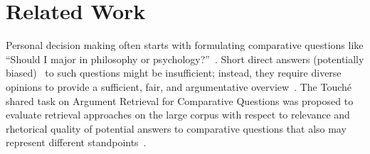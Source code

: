 \section{Related Work}

Personal decision making often starts with formulating comparative questions like ``Should I major in philosophy or psychology?''~\cite{BondarenkoFBGAPBSWPH2020,BondarenkoGFBAPBSWPH2021,BondarenkoFKSGBPBSWPH2022}. Short direct answers (potentially biased)~\cite{PotthastHS2020} to such questions might be insufficient; instead, they require diverse opinions to provide a sufficient, fair, and argumentative overview~\cite{BondarenkoFBGAPBSWPH2020}.
The Touch{\'e} shared task on Argument Retrieval for Comparative Questions was proposed to evaluate retrieval approaches on the large corpus with respect to relevance and rhetorical quality of potential answers to comparative questions that also may represent different standpoints~\cite{BondarenkoADHBH22}.

